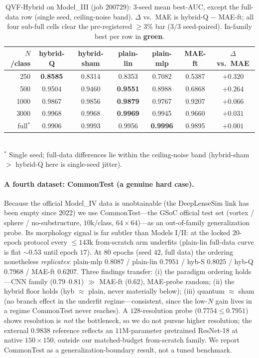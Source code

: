 \documentclass[10pt,letterpaper]{article}
\theoremstyle{plain}
\theoremstyle{definition}
\newcommand{\win}[1]{\textcolor{good}{\textbf{#1}}}
\begin{document}
\begin{table}[h!]
\centering
\caption{QVF-Hybrid on Model\_III (job 200729): $3$-seed mean best-AUC, except the
full-data row (single seed, ceiling-noise band). $\Delta$ vs.\ MAE is
hybrid-Q $-$ MAE-ft; all four sub-full cells clear the pre-registered $\geq 3\%$
bar ($3/3$ seed-paired). In-family best per row in \textbf{\textcolor{good}{green}}.}
\label{tab:m3}
\begin{tabular}{@{}rcccccc@{}}
\toprule
$N$/class & hybrid-Q & hybrid-sham & plain-lin & plain-mlp & MAE-ft & $\Delta$ vs.\ MAE \\
\midrule
250        & \win{0.8585} & 0.8314 & 0.8353 & 0.7082 & 0.5387 & \win{$+0.320$} \\
500        & 0.9504 & 0.9460 & \win{0.9551} & 0.8988 & 0.6868 & \win{$+0.264$} \\
1000       & 0.9867 & 0.9856 & \win{0.9879} & 0.9767 & 0.9207 & \win{$+0.066$} \\
3000       & 0.9968 & 0.9968 & \win{0.9969} & 0.9945 & 0.9660 & \win{$+0.031$} \\
full$^{*}$ & 0.9906 & 0.9993 & 0.9956 & \win{0.9996} & 0.9895 & $+0.001$ \\
\bottomrule
\end{tabular}\\[2pt]
{\footnotesize $^{*}$ Single seed; full-data differences lie within the
ceiling-noise band (hybrid-sham $>$ hybrid-Q here is single-seed jitter).}
\end{table}

\paragraph{A fourth dataset: CommonTest (a genuine hard case).}
Because the official Model\_IV data is unobtainable (the DeepLenseSim link has been
empty since 2022) we use CommonTest---the GSoC official test set
(vortex / sphere / no-substructure, $10$k/class, $64\times64$)---as an
out-of-family generalization probe. Its morphology signal is far subtler than
Models I/II: at the locked $20$-epoch protocol every $\leq143$k from-scratch arm
underfits (plain-lin full-data curve is flat $\sim0.53$ until epoch $17$). At $80$
epochs (seed $42$, full data) the ordering nonetheless \emph{replicates}:
plain-mlp $0.8087$ / plain-lin $0.7951$ / hyb-S $0.8025$ / hyb-Q $0.7968$ /
MAE-ft $0.6207$. Three findings transfer: (i) the paradigm ordering holds---CNN
family ($0.79$--$0.81$) $\gg$ MAE-ft ($0.62$), MAE-probe random; (ii) the hybrid
floor holds (hyb $\approx$ plain, never materially below); (iii) quantum
$\approx$ sham (no branch effect in the underfit regime---consistent, since the
low-$N$ gain lives in a regime CommonTest never reaches).
A $128$-resolution probe ($0.7754 \leq 0.7951$) shows resolution is \emph{not} the
bottleneck, so we do not pursue higher resolution; the external $0.9838$ reference
reflects an $11$M-parameter pretrained ResNet-18 at native $150\times150$, outside
our matched-budget from-scratch family. We report CommonTest as a
generalization-boundary result, not a tuned benchmark.
\end{document}
